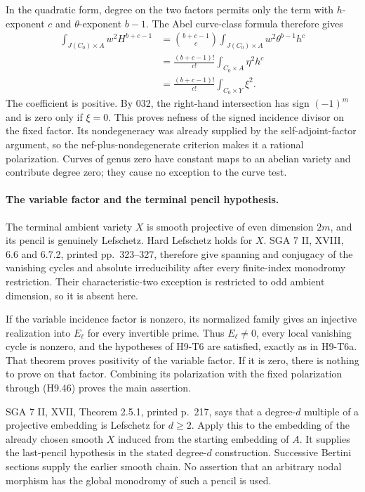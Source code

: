 In the quadratic form, degree on the two factors permits only the term
with $h$-exponent $c$ and $\theta$-exponent $b-1$. The Abel curve-class
formula therefore gives
\[
 \begin{aligned}
 \int_{J(C_0)\times A}w^2H^{b+c-1}
  &=\binom{b+c-1}{c}
       \int_{J(C_0)\times A}w^2\theta^{b-1}h^c\\
  &=\frac{(b+c-1)!}{c!}
       \int_{C_0\times A}\eta^2h^c\\
  &=\frac{(b+c-1)!}{c!}
       \int_{C_0\times Y}\xi^2.
 \end{aligned}
 \tag{H9.47}
\]
The coefficient is positive. By 032, the right-hand intersection has
sign $(-1)^m$ and is zero only if $\xi=0$. This proves nefness of the
signed incidence divisor on the fixed factor. Its nondegeneracy was
already supplied by the self-adjoint-factor argument, so the
nef-plus-nondegenerate criterion makes it a rational polarization.
Curves of genus zero have constant maps to an abelian variety and
contribute degree zero; they cause no exception to the curve test.

\paragraph{The variable factor and the terminal pencil hypothesis.}
The terminal ambient variety $X$ is smooth projective of even
dimension $2m$, and its pencil is genuinely Lefschetz. Hard Lefschetz
holds for $X$. SGA 7 II, XVIII, 6.6 and 6.7.2, printed pp.~323--327,
therefore give spanning and conjugacy of the vanishing cycles and
absolute irreducibility after every finite-index monodromy restriction.
Their characteristic-two exception is restricted to odd ambient
dimension, so it is absent here.

If the variable incidence factor is nonzero, its normalized family
gives an injective realization into $E_\ell$ for every invertible
prime. Thus $E_\ell\ne0$, every local vanishing cycle is nonzero,
and the hypotheses of H9-T6 are satisfied, exactly as in H9-T6a.
That theorem proves positivity of the variable factor. If it is zero,
there is nothing to prove on that factor. Combining its polarization
with the fixed polarization through (H9.46) proves the main assertion.

SGA 7 II, XVII, Theorem 2.5.1, printed p.~217, says that a degree-$d$
multiple of a projective embedding is Lefschetz for $d\ge2$. Apply
this to the embedding of the already chosen smooth $X$ induced from
the starting embedding of $A$. It supplies the last-pencil hypothesis
in the stated degree-$d$ construction. Successive Bertini sections
supply the earlier smooth chain. No assertion that an arbitrary
nodal morphism has the global monodromy of such a pencil is used.

